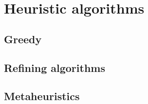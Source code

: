 \chapter{Heuristic algorithms}

\section{Greedy}

\section{Refining algorithms}

\section{Metaheuristics}